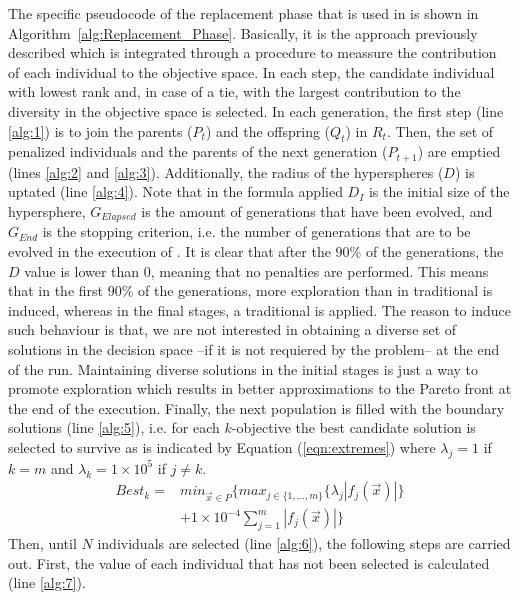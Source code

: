 The specific pseudocode of the replacement phase that is used in \VSDMOEA{} is shown in Algorithm~\ref{alg:Replacement_Phase}.
%
Basically, it is the approach previously described which is integrated through a procedure to meassure the contribution of each individual to the objective space.
%
In each step, the candidate individual with lowest rank and, in case of a tie, with the largest contribution to the diversity in the objective space is selected.
%
In each generation, the first step (line \ref{alg:1}) is to join the parents ($P_t$) and the offspring ($Q_t$) in $R_t$.
%
Then, the set of penalized individuals and the parents of the next generation ($P_{t+1}$) are emptied (lines \ref{alg:2} and \ref{alg:3}).
%
Additionally, the radius of the hyperspheres ($D$) is uptated (line \ref{alg:4}).
%
Note that in the formula applied $D_I$ is the initial size of the hypersphere, $G_{Elapsed}$ is the amount of generations that have been evolved, and $G_{End}$
is the stopping criterion, i.e. the number of generations that are to be evolved in the execution of \VSDMOEA{}.
%
It is clear that after the $90\%$ of the generations, the $D$ value is lower than 0, meaning that no penalties are performed.
%
This means that in the first $90\%$ of the generations, more exploration than in traditional \MOEAS{} is induced, whereas 
in the final stages, a traditional \MOEA{} is applied.
%
The reason to induce such behaviour is that, we are not interested in obtaining a diverse set of solutions in the decision space --if it is not requiered by the problem-- at the end of the run.
%
Maintaining diverse solutions in the initial stages is just a way to promote exploration which results in better approximations to the Pareto front at the end of the execution.
%
Finally, the next population is filled with the boundary solutions (line \ref{alg:5}), i.e. for each $k$-objective the best candidate solution is selected to survive as is indicated by Equation (\ref{eqn:extremes}) where $\lambda_j = 1$ if $k=m$ and  $\lambda_k = 1 \times 10^5$ if $j \neq k$.
\begin{equation}\label{eqn:extremes}
\begin{split}
 Best_k = &  min_{ \vec{x} \in P} \{max_{j \in \{1, ..., m\} } \{ \lambda_j | f_j( \vec{x} ) | \} \\
& + 1 \times 10^{-4} \sum_{j=1}^m |f_j( \vec{x} ) | \}  
\end{split}
\end{equation}
%
Then, until $N$ individuals are selected (line \ref{alg:6}), the following steps are carried out.
%
First, the \DCN{} value of each individual that has not been selected is calculated (line \ref{alg:7}).
